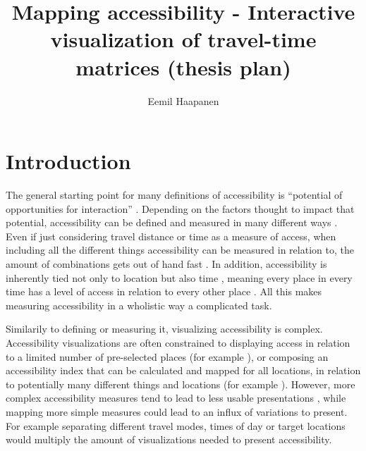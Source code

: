 \documentclass[12pt]{article}
\title{Mapping accessibility - Interactive visualization of travel-time matrices (thesis plan)}
\author{Eemil Haapanen}
\begin{document}
\maketitle

\section{Introduction}
The general starting point for many definitions of accessibility is
\enquote{potential of opportunities for interaction} \parencite{han1959}.
Depending on the factors thought to impact that potential,
accessibility can be defined and measured in many different ways \parencite{pap2016}.
Even if just considering travel distance or time as a measure of access,
when including all the different things accessibility can be measured in relation to,
the amount of combinations gets out of hand fast \parencite{lev2020}.
In addition, accessibility is inherently tied not only to location
but also time \parencite{jar2018},
meaning every place in every time has a level of access
in relation to every other place \parencite{lev2020}.
All this makes measuring accessibility in a wholistic way a complicated task.

Similarily to defining or measuring it, visualizing accessibility is complex.
Accessibility visualizations are often constrained to displaying access in relation to
a limited number of pre-selected places (for example \textcite{wei2018}),
or composing an accessibility index that can be calculated and mapped for all locations,
in relation to potentially many different things and locations (for example \textcite{kim2019}).
However, more complex accessibility measures tend to lead to
less usable presentations \parencite{te2014},
while mapping more simple measures could lead to an influx of variations to present.
For example separating different travel modes, times of day or target locations
would multiply the amount of visualizations needed to present accessibility.
\end{document}
